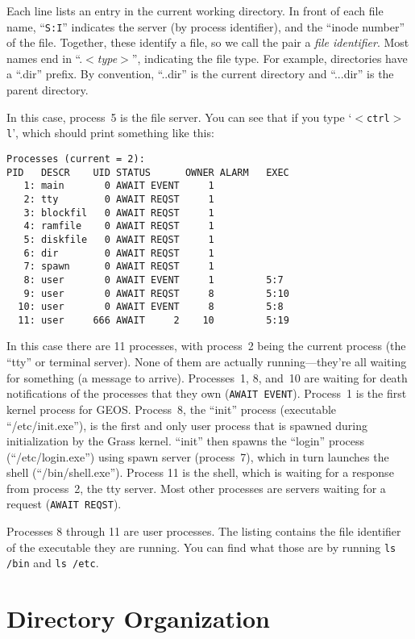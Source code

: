 \documentclass{article}
\begin{document}
Each line lists an entry in the current working directory.  In front of
each file name, ``\texttt{S:I}'' indicates the server (by process
identifier), and the ``inode number'' of the file.  Together, these
identify a file, so we call the pair a \emph{file identifier}.
Most names end in ``.$<$\emph{type}$>$'', indicating the file type.
For example, directories have a ``.dir'' prefix.
By convention, ``..dir'' is the current directory and ``...dir'' is the
parent directory.

In this case, process~5 is the file server.  You can see that if you
type `\texttt{$<$ctrl$>$l}', which should print something like this:

\begin{verbatim}
Processes (current = 2):
PID   DESCR    UID STATUS      OWNER ALARM   EXEC
   1: main       0 AWAIT EVENT     1
   2: tty        0 AWAIT REQST     1
   3: blockfil   0 AWAIT REQST     1
   4: ramfile    0 AWAIT REQST     1
   5: diskfile   0 AWAIT REQST     1
   6: dir        0 AWAIT REQST     1
   7: spawn      0 AWAIT REQST     1
   8: user       0 AWAIT EVENT     1         5:7
   9: user       0 AWAIT REQST     8         5:10
  10: user       0 AWAIT EVENT     8         5:8
  11: user     666 AWAIT     2    10         5:19
\end{verbatim}

In this case there are 11 processes, with process~2 being the
current process (the ``tty'' or terminal server).  None of them are actually
running---they're all waiting for something (a message to arrive).
Processes~1, 8, and~10 are waiting for death notifications of the processes
that they own (\texttt{AWAIT EVENT}).
Process~1 is the first kernel process for GEOS.
Process~8, the ``init'' process (executable ``/etc/init.exe''),
is the first and only user process that is spawned during initialization
by the Grass kernel.  ``init'' then spawns the ``login'' process
(``/etc/login.exe'') using spawn server (process~7), which in turn
launches the shell (``/bin/shell.exe'').
Process 11 is the shell, which is waiting for a response from process~2,
the tty server.
Most other processes are servers waiting for a request (\texttt{AWAIT REQST}).

Processes 8 through 11 are user processes.  The listing contains the
file identifier of the executable they are running.  You can find what
those are by running \texttt{ls /bin} and \texttt{ls /etc}.

\section{Directory Organization}
\end{document}

